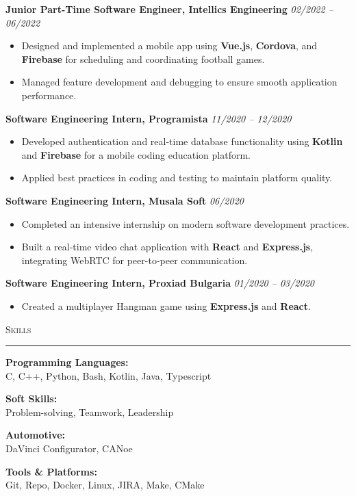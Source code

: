 \documentclass[a4paper,10pt]{article}
\newcommand{\textwithhr}[1]{
\textsc{#1}

\vspace{1mm}
\hrule \hfill
}
\begin{document}
\textbf{Junior Part-Time Software Engineer, Intellics Engineering} \hspace*{\fill} \textit{02/2022 -- 06/2022}
\begin{itemize}
    \item Designed and implemented a mobile app using \textbf{Vue.js}, \textbf{Cordova}, and \textbf{Firebase} for scheduling and coordinating football games.
    \item Managed feature development and debugging to ensure smooth application performance.
\end{itemize}

\textbf{Software Engineering Intern, Programista} \hspace*{\fill} \textit{11/2020 -- 12/2020}
\begin{itemize}
    \item Developed authentication and real-time database functionality using \textbf{Kotlin} and \textbf{Firebase} for a mobile coding education platform.
    \item Applied best practices in coding and testing to maintain platform quality.
\end{itemize}

\textbf{Software Engineering Intern, Musala Soft} \hspace*{\fill} \textit{06/2020}
\begin{itemize}
    \item Completed an intensive internship on modern software development practices.
    \item Built a real-time video chat application with \textbf{React} and \textbf{Express.js}, integrating WebRTC for peer-to-peer communication.
\end{itemize}

\textbf{Software Engineering Intern, Proxiad Bulgaria} \hspace*{\fill} \textit{01/2020 -- 03/2020}
\begin{itemize}
    \item Created a multiplayer Hangman game using \textbf{Express.js} and \textbf{React}.
\end{itemize}

\textwithhr{Skills}

\begin{multicols}{2}
\noindent
\textbf{Programming Languages:} \\
C, C++, Python, Bash, Kotlin, Java, Typescript

\noindent
\textbf{Soft Skills:} \\
Problem-solving, Teamwork, Leadership

\noindent
\textbf{Automotive:} \\
DaVinci Configurator, CANoe 

\noindent
\textbf{Tools \& Platforms:} \\
Git, Repo, Docker, Linux, JIRA, Make, CMake

\end{multicols}
\end{document}

